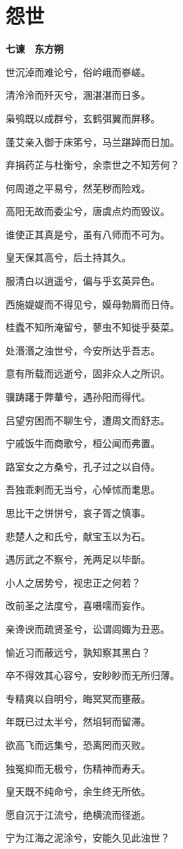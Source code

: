 \documentclass[12pt,a4paper]{ctexbook}
\begin{document}
\section{怨世}
\textbf{七谏　东方朔}\par\vspace{0.5em}
世沉淖而难论兮，俗岒峨而嵾嵯。\par
清泠泠而歼灭兮，溷湛湛而日多。\par
枭鸮既以成群兮，玄鹤弭翼而屏移。\par
蓬艾亲入御于床笫兮，马兰踸踔而日加。\par
弃捐药芷与杜衡兮，余柰世之不知芳何？\par
何周道之平易兮，然芜秽而险戏。\par
高阳无故而委尘兮，唐虞点灼而毁议。\par
谁使正其真是兮，虽有八师而不可为。\par
皇天保其高兮，后土持其久。\par
服清白以逍遥兮，偏与乎玄英异色。\par
西施媞媞而不得见兮，嫫母勃屑而日侍。\par
桂蠹不知所淹留兮，蓼虫不知徙乎葵菜。\par
处湣湣之浊世兮，今安所达乎吾志。\par
意有所载而远逝兮，固非众人之所识。\par
骥踌躇于弊輂兮，遇孙阳而得代。\par
吕望穷困而不聊生兮，遭周文而舒志。\par
宁戚饭牛而商歌兮，桓公闻而弗置。\par
路室女之方桑兮，孔子过之以自侍。\par
吾独乖剌而无当兮，心悼怵而耄思。\par
思比干之恲恲兮，哀子胥之慎事。\par
悲楚人之和氏兮，献宝玉以为石。\par
遇厉武之不察兮，羌两足以毕斮。\par
小人之居势兮，视忠正之何若？\par
改前圣之法度兮，喜嗫嚅而妄作。\par
亲谗谀而疏贤圣兮，讼谓闾娵为丑恶。\par
愉近习而蔽远兮，孰知察其黑白？\par
卒不得效其心容兮，安眇眇而无所归薄。\par
专精爽以自明兮，晦冥冥而壅蔽。\par
年既已过太半兮，然埳轲而留滞。\par
欲高飞而远集兮，恐离罔而灭败。\par
独冤抑而无极兮，伤精神而寿夭。\par
皇天既不纯命兮，余生终无所依。\par
愿自沉于江流兮，绝横流而径逝。\par
宁为江海之泥涂兮，安能久见此浊世？\par
\end{document}

